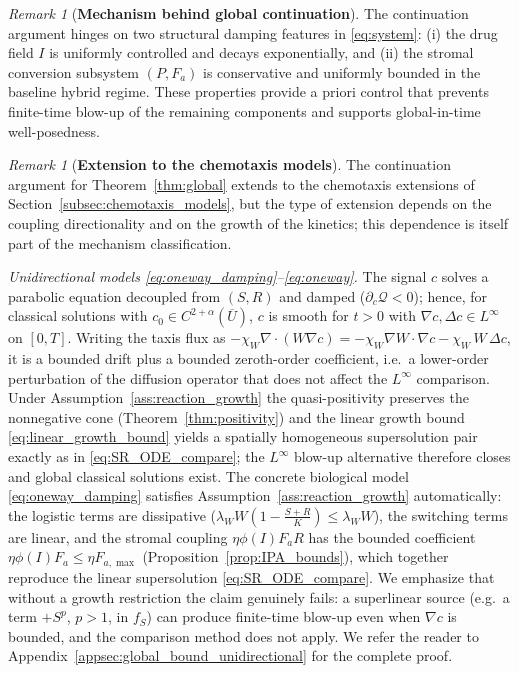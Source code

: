\documentclass[pdflatex,sn-mathphys-ay]{sn-jnl}
\theoremstyle{thmstyleone}
\theoremstyle{definition}
\theoremstyle{remark}
\newtheorem{remark}[theorem]{Remark}
\begin{document}
\begin{remark}[\textbf{Mechanism behind global continuation}]
The continuation argument hinges on two structural damping features in \eqref{eq:system}: 
(i) the drug field $I$ is uniformly controlled and decays exponentially, and 
(ii) the stromal conversion subsystem $(P,F_a)$ is conservative and uniformly bounded in the baseline hybrid regime. 
These properties provide a priori control that prevents finite-time blow-up of the remaining components and supports global-in-time well-posedness.
\end{remark}

\begin{remark}[\textbf{Extension to the chemotaxis models}]
\label{rmk:wp_extension}
The continuation argument for Theorem~\ref{thm:global} extends to the chemotaxis
extensions of Section~\ref{subsec:chemotaxis_models}, but the type of extension
depends on the coupling directionality and on the growth of the kinetics; this
dependence is itself part of the mechanism classification.

\emph{Unidirectional models \eqref{eq:oneway_damping}--\eqref{eq:oneway}.}
The signal $c$ solves a parabolic equation decoupled from $(S,R)$ and damped
($\partial_c\mathcal Q<0$); hence, for classical solutions with $c_0\in
C^{2+\alpha}(\overline U)$, $c$ is smooth for $t>0$ with $\nabla c,\Delta c\in
L^\infty$ on $[0,T]$. Writing the taxis flux as
$-\chi_W\nabla\!\cdot(W\nabla c)=-\chi_W\nabla W\!\cdot\!\nabla c-\chi_W\,W\,\Delta c$,
it is a bounded drift plus a bounded zeroth-order coefficient, i.e.\ a lower-order
perturbation of the diffusion operator that does not affect the $L^\infty$
comparison. Under Assumption~\ref{ass:reaction_growth} the quasi-positivity
preserves the nonnegative cone (Theorem~\ref{thm:positivity}) and the linear
growth bound \eqref{eq:linear_growth_bound} yields a spatially homogeneous
supersolution pair exactly as in \eqref{eq:SR_ODE_compare}; the $L^\infty$
blow-up alternative therefore closes and global classical solutions exist. The
concrete biological model \eqref{eq:oneway_damping} satisfies
Assumption~\ref{ass:reaction_growth} automatically: the logistic terms are
dissipative ($\lambda_W W(1-\tfrac{S+R}{K})\le\lambda_W W$), the switching terms
are linear, and the stromal coupling $\eta\phi(I)F_aR$ has the bounded coefficient
$\eta\phi(I)F_a\le \eta F_{a,\max}$ (Proposition~\ref{prop:IPA_bounds}), which
together reproduce the linear supersolution \eqref{eq:SR_ODE_compare}. We
emphasize that without a growth restriction the claim genuinely fails: a
superlinear source (e.g.\ a term $+S^p$, $p>1$, in $f_S$) can produce finite-time
blow-up even when $\nabla c$ is bounded, and the comparison method does not apply. We refer the reader to Appendix~\ref{appsec:global_bound_unidirectional} for the complete proof.


\end{remark}
\end{document}
